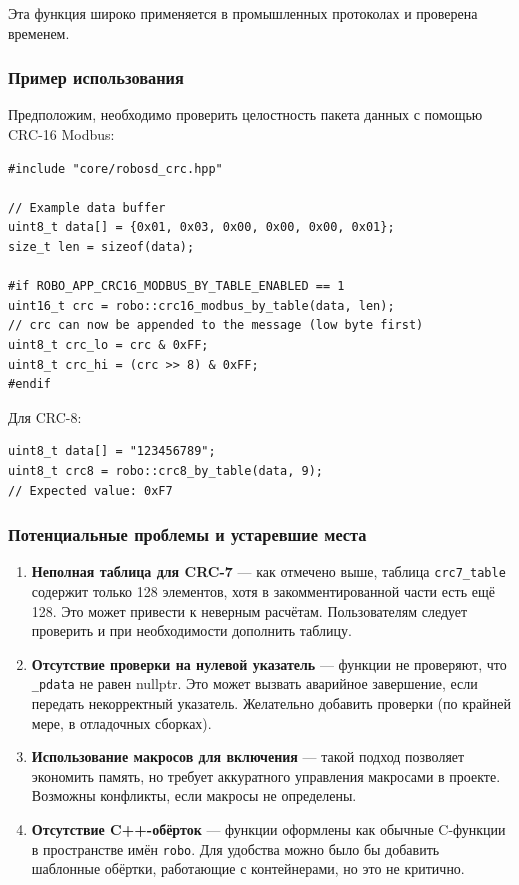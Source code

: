 \documentclass[a4paper,12pt]{article}
\begin{document}
Эта функция широко применяется в промышленных протоколах и проверена временем.

\subsubsection{Пример использования}

Предположим, необходимо проверить целостность пакета данных с помощью CRC-16 Modbus:

\begin{lstlisting}[caption={Вычисление CRC-16 Modbus}]
#include "core/robosd_crc.hpp"

// Example data buffer
uint8_t data[] = {0x01, 0x03, 0x00, 0x00, 0x00, 0x01};
size_t len = sizeof(data);

#if ROBO_APP_CRC16_MODBUS_BY_TABLE_ENABLED == 1
uint16_t crc = robo::crc16_modbus_by_table(data, len);
// crc can now be appended to the message (low byte first)
uint8_t crc_lo = crc & 0xFF;
uint8_t crc_hi = (crc >> 8) & 0xFF;
#endif
\end{lstlisting}

Для CRC-8:

\begin{lstlisting}[caption={Вычисление CRC-8}]
uint8_t data[] = "123456789";
uint8_t crc8 = robo::crc8_by_table(data, 9);
// Expected value: 0xF7
\end{lstlisting}

\subsubsection{Потенциальные проблемы и устаревшие места}

\begin{enumerate}
    \item \textbf{Неполная таблица для CRC-7} — как отмечено выше, таблица \texttt{crc7\_table} содержит только 128 элементов, хотя в закомментированной части есть ещё 128. Это может привести к неверным расчётам. Пользователям следует проверить и при необходимости дополнить таблицу.

    \item \textbf{Отсутствие проверки на нулевой указатель} — функции не проверяют, что \texttt{\_pdata} не равен nullptr. Это может вызвать аварийное завершение, если передать некорректный указатель. Желательно добавить проверки (по крайней мере, в отладочных сборках).

    \item \textbf{Использование макросов для включения} — такой подход позволяет экономить память, но требует аккуратного управления макросами в проекте. Возможны конфликты, если макросы не определены.

    \item \textbf{Отсутствие C++-обёрток} — функции оформлены как обычные C-функции в пространстве имён \texttt{robo}. Для удобства можно было бы добавить шаблонные обёртки, работающие с контейнерами, но это не критично.
\end{enumerate}
\end{document}
